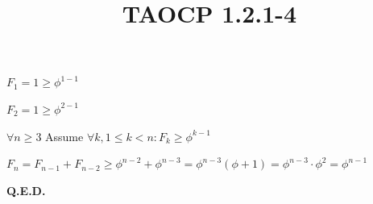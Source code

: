 \documentclass{article}
\title{TAOCP 1.2.1\mbox{-}4}
\begin{document}
\maketitle

\( F_{1} = 1 \geq \phi^{1-1} \)

\( F_{2} = 1 \geq \phi^{2-1} \)

\( \forall n \geq 3 \) Assume \( \forall k, 1 \leq k < n: F_{k} \geq \phi^{k-1} \)

\( F_{n} = F_{n-1} + F_{n-2} \geq \phi^{n-2} + \phi^{n-3} = \phi^{n-3}(\phi + 1) = \phi^{n-3} \cdot \phi^{2} = \phi^{n-1} \)

\textbf{Q.E.D.}
\end{document}
